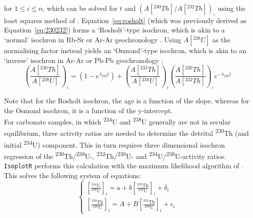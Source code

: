 \begin{refsection}
\noindent for $1 \leq i \leq n$, which can be solved for $t$ and
$\left(A[{}^{230}Th]/A[{}^{232}Th]\right)_{\!\circ}$ using the least
squares method of \citet{york2004}. Equation~\ref{eq:rosholt} (which
was previously derived as Equation~\ref{eq:230232}) forms a
`Rosholt'-type isochron, which is akin to a `normal' isochron in Rb-Sr
or Ar-Ar geochronology \citep{rosholt1976}. Using $A[{}^{238}U]$ as
the normalising factor instead yields an `Osmond'-type isochron, which
is akin to an `inverse' isochron in Ar-Ar or Pb-Pb geochronology
\citep{osmond1970, ludwig2003b}:
\begin{equation}
  \left(\frac{A[{}^{230}Th]}{A[{}^{238}U]}\right)_i =
  \left(1-e^{\lambda_{230}t}\right) +
  \left(\frac{A[{}^{232}Th]}{A[{}^{238}U]}\right)_i
  \left(\frac{A[{}^{230}Th]}{A[{}^{232}Th]}\right)_\circ
  e^{-\lambda_{230}t}
  \label{eq:osmond}
\end{equation}

Note that for the Rosholt isochron, the age is a function of the
slope, whereas for the Osmond isochron, it is a function of the
y-intercept.\\

For carbonate samples, in which \textsuperscript{234}U and
\textsuperscript{238}U generally are not in secular equilibrium, three
activity ratios are needed to determine the detrital
\textsuperscript{230}Th (and initial \textsuperscript{234}U)
component. This in turn requires three dimensional isochron regression
of the \textsuperscript{230}Th/\textsuperscript{238}U-,
\textsuperscript{232}Th/\textsuperscript{238}U- and
\textsuperscript{234}U/\textsuperscript{238}U-activity
ratios. \texttt{IsoplotR} performs this calculation with the maximum
likelihood algorithm of \citet{ludwig1994}. This solves the following
system of equations:
\begin{equation}
  \begin{cases}
    \left[\frac{{}^{234}\mbox{U}}{{}^{238}\mbox{U}}\right]_i =
    a + b \left[\frac{{}^{232}\mbox{Th}}{{}^{238}\mbox{U}}\right]_i + \delta_i \\
    \left[\frac{{}^{230}\mbox{Th}}{{}^{238}\mbox{U}}\right]_i =
    A + B \left[\frac{{}^{232}\mbox{Th}}{{}^{238}\mbox{U}}\right]_i + \epsilon_i
  \end{cases}
  \label{eq:titterington}
\end{equation}


\end{refsection}
